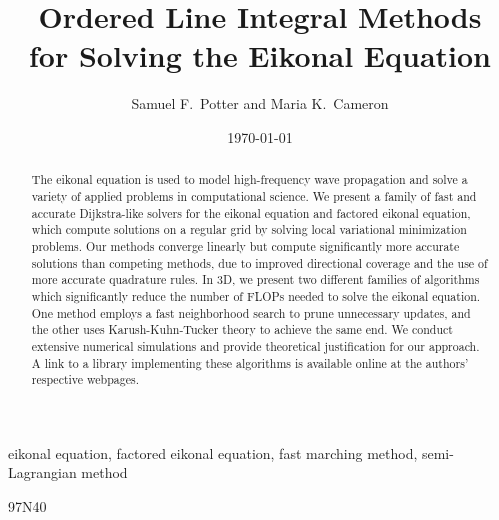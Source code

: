 \documentclass[eikonal.tex]{subfiles}
\begin{document}
\title{Ordered Line Integral Methods \\ for Solving the Eikonal Equation}
\author{Samuel F.\ Potter and Maria K.\ Cameron}
\date{\today}

\maketitle

\begin{abstract}
  The eikonal equation is used to model high-frequency wave
  propagation and solve a variety of applied problems in computational
  science. We present a family of fast and accurate Dijkstra-like
  solvers for the eikonal equation and factored eikonal equation,
  which compute solutions on a regular grid by solving local
  variational minimization problems. Our methods converge linearly but
  compute significantly more accurate solutions than competing
  methods, due to improved directional coverage and the use of more
  accurate quadrature rules. In 3D, we present two different families
  of algorithms which significantly reduce the number of FLOPs needed
  to solve the eikonal equation. One method employs a fast
  neighborhood search to prune unnecessary updates, and the other uses
  Karush-Kuhn-Tucker theory to achieve the same end. We conduct
  extensive numerical simulations and provide theoretical
  justification for our approach. A link to a library implementing
  these algorithms is available online at the authors’ respective
  webpages.
\end{abstract}

\begin{keywords}
  eikonal equation, factored eikonal equation, fast marching method,
  semi-Lagrangian method
\end{keywords}

\begin{AMS}
  97N40
\end{AMS}
\end{document}

